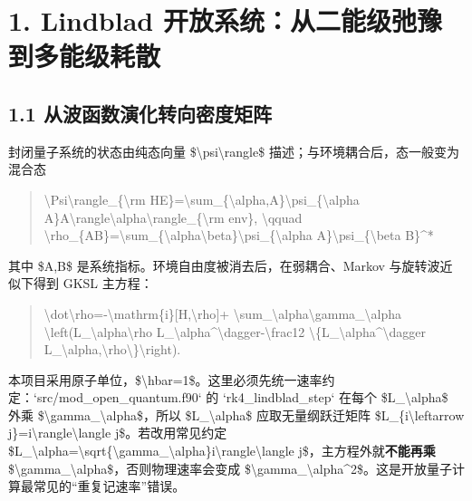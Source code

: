 \documentclass[UTF8,openany,11pt,fontset=fandol]{ctexbook}
\begin{document}
\section{\texorpdfstring{\textbf{1. Lindblad
开放系统：从二能级弛豫到多能级耗散}}{1. Lindblad 开放系统：从二能级弛豫到多能级耗散}}\label{lindblad-ux5f00ux653eux7cfbux7edfux4eceux4e8cux80fdux7ea7ux5f1bux8c6bux5230ux591aux80fdux7ea7ux8017ux6563}

\subsection{\texorpdfstring{\textbf{1.1
从波函数演化转向密度矩阵}}{1.1 从波函数演化转向密度矩阵}}\label{ux4eceux6ce2ux51fdux6570ux6f14ux5316ux8f6cux5411ux5bc6ux5ea6ux77e9ux9635}

封闭量子系统的状态由纯态向量
\$\textbar\textbackslash psi\textbackslash rangle\$
描述；与环境耦合后，态一般变为混合态

\begin{quote}
\textbar\textbackslash Psi\textbackslash rangle\_\{\textbackslash rm
HE\}=\textbackslash sum\_\{\textbackslash alpha,A\}\textbackslash psi\_\{\textbackslash alpha
A\}\textbar A\textbackslash rangle\textbar\textbackslash alpha\textbackslash rangle\_\{\textbackslash rm
env\}, \textbackslash qquad
\textbackslash rho\_\{AB\}=\textbackslash sum\_\{\textbackslash alpha\textbackslash beta\}\textbackslash psi\_\{\textbackslash alpha
A\}\textbackslash psi\_\{\textbackslash beta B\}\^{}*
\end{quote}

其中 \$A,B\$ 是系统指标。环境自由度被消去后，在弱耦合、Markov
与旋转波近似下得到 GKSL 主方程：

\begin{quote}
\textbackslash dot\textbackslash rho=-\textbackslash mathrm\{i\}{[}H,\textbackslash rho{]}+
\textbackslash sum\_\textbackslash alpha\textbackslash gamma\_\textbackslash alpha
\textbackslash left(L\_\textbackslash alpha\textbackslash rho
L\_\textbackslash alpha\^{}\textbackslash dagger-\textbackslash frac12
\textbackslash\{L\_\textbackslash alpha\^{}\textbackslash dagger
L\_\textbackslash alpha,\textbackslash rho\textbackslash\}\textbackslash right).
\end{quote}

本项目采用原子单位，\$\textbackslash hbar=1\$。这里必须先统一速率约定：`src/mod\_open\_quantum.f90`
的 `rk4\_lindblad\_step` 在每个 \$L\_\textbackslash alpha\$ 外乘
\$\textbackslash gamma\_\textbackslash alpha\$，所以
\$L\_\textbackslash alpha\$ 应取无量纲跃迁矩阵
\$L\_\{i\textbackslash leftarrow
j\}=\textbar i\textbackslash rangle\textbackslash langle
j\textbar\$。若改用常见约定
\$L\_\textbackslash alpha=\textbackslash sqrt\{\textbackslash gamma\_\textbackslash alpha\}\textbar i\textbackslash rangle\textbackslash langle
j\textbar\$，主方程外就\textbf{不能再乘}
\$\textbackslash gamma\_\textbackslash alpha\$，否则物理速率会变成
\$\textbackslash gamma\_\textbackslash alpha\^{}2\$。这是开放量子计算最常见的``重复记速率''错误。
\end{document}
